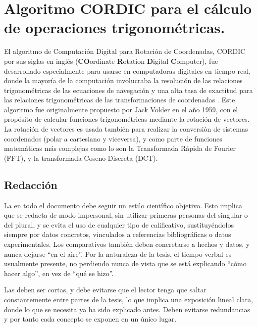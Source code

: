 

\section{Algoritmo CORDIC para el cálculo de operaciones trigonométricas.}

El algoritmo de Computación Digital para Rotación de Coordenadas, CORDIC por sus siglas en inglés (\textbf{CO}ordinate \textbf{R}otation \textbf{D}igital \textbf{C}omputer), fue desarrollado especialmente para usarse en computadoras digitales en tiempo real, donde la mayoría de la computación involucraba la resolución de las relaciones trigonométricas de las ecuaciones de navegación y una alta tasa de exactitud para las relaciones trigonométricas de las transformaciones de coordenadas \cite{CORDIC}.
Este algoritmo fue  originalmente propuesto por Jack Volder en el año 1959, con el propósito de calcular funciones trigonométricas mediante la rotación de vectores. La rotación de vectores es usada también para realizar la conversión de sistemas coordenados (polar a cartesiano y viceversa), y como parte de funciones matemáticas más complejas como lo son la Transformada Rápida de Fourier (FFT), y la transformada Coseno Discreta (DCT). \cite{Oppenheim1998}



\subsection{Redacción}

La  en todo el documento debe seguir un estilo científico
objetivo. Esto implica que se redacta de modo impersonal, sin utilizar primeras
personas del singular o del plural, y se evita el uso de cualquier tipo de
calificativo, sustituyéndolos siempre por datos concretos, vinculados a
referencias bibliográficas o datos experimentales. Los comparativos también
deben concretarse a hechos y datos, y nunca dejarse ``en el aire''. Por la
naturaleza de la tesis, el tiempo verbal es usualmente presente, no perdiendo
nunca de vista que se está explicando ``cómo hacer algo'', en vez de ``qué se
hizo''.

Las  deben ser cortas, y debe evitarse que el lector tenga que saltar
constantemente entre partes de la tesis, lo que implica una exposición lineal
clara, donde lo que se necesita ya ha sido explicado antes. Deben evitarse
redundancias y por tanto cada concepto se exponen en un único lugar.

